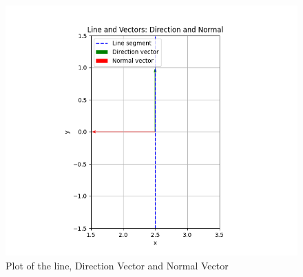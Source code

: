 \documentclass[journal]{IEEEtran}
\begin{document}
\begin{figure}[h!]
   \centering
   \includegraphics[width = 1\linewidth]{figs/fig.png}
   \caption{Plot of the line, Direction Vector and Normal Vector}
   \label{stemplot}
\end{figure}
\end{document}
